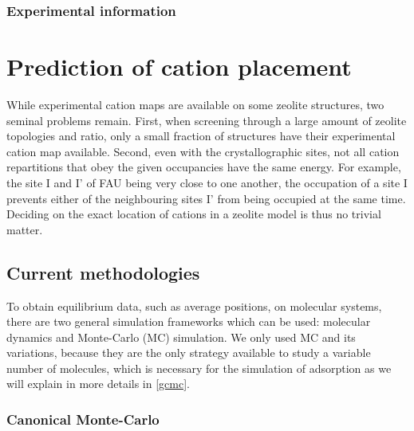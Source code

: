 \documentclass[main.tex]{subfiles}
\begin{document}
\subsubsection{Experimental information}


\section{Prediction of cation placement}

While experimental cation maps are available on some zeolite structures, two seminal problems remain. First, when screening through a large amount of zeolite topologies and \SiAl ratio, only a small fraction of structures have their experimental cation map available. Second, even with the crystallographic sites, not all cation repartitions that obey the given occupancies have the same energy. For example, the site I and I' of FAU being very close to one another, the occupation of a site I prevents either of the neighbouring sites I' from being occupied at the same time. Deciding on the exact location of cations in a zeolite model is thus no trivial matter.

\subsection{Current methodologies}

To obtain equilibrium data, such as average positions, on molecular systems, there are two general simulation frameworks which can be used: molecular dynamics and Monte-Carlo (MC) simulation. We only used MC and its variations, because they are the only strategy available to study a variable number of molecules, which is necessary for the simulation of adsorption as we will explain in more details in \autoref{gcmc}.

\subsubsection{Canonical Monte-Carlo}
\end{document}
